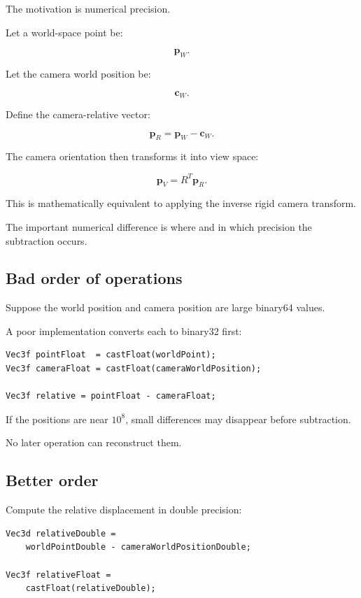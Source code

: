 The motivation is numerical precision.

Let a world-space point be:

\[
 \mathbf p_W.
\]

Let the camera world position be:

\[
 \mathbf c_W.
\]

Define the camera-relative vector:

\[
 \boxed{ \mathbf p_R=\mathbf p_W-\mathbf c_W }.
\]

The camera orientation then transforms it into view space:

\[
 \boxed{ \mathbf p_V=R^T\mathbf p_R }.
\]

This is mathematically equivalent to applying the inverse rigid camera transform.

The important numerical difference is where and in which precision the subtraction occurs.

\subsection{Bad order of operations}\label{02-foundations-ii-ch036-bad-order-of-operations}

Suppose the world position and camera position are large binary64 values.

A poor implementation converts each to binary32 first:

\begin{verbatim}
Vec3f pointFloat  = castFloat(worldPoint);
Vec3f cameraFloat = castFloat(cameraWorldPosition);

Vec3f relative = pointFloat - cameraFloat;
\end{verbatim}

If the positions are near \(10^8\), small differences may disappear before subtraction.

No later operation can reconstruct them.

\subsection{Better order}\label{02-foundations-ii-ch036-better-order}

Compute the relative displacement in double precision:

\begin{verbatim}
Vec3d relativeDouble =
    worldPointDouble - cameraWorldPositionDouble;

Vec3f relativeFloat =
    castFloat(relativeDouble);
\end{verbatim}

